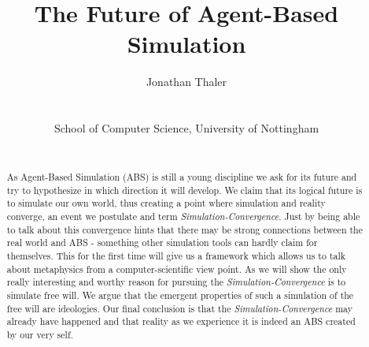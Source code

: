\documentclass[a4paper, 10pt, conference]{../../templates/IEEEconf/IEEEconf}
\title{The Future of Agent-Based Simulation}
\author{
	Jonathan Thaler \\
	\email{jonathan.thaler@nottingham.ac.uk} \\
	\begin{affiliation}
		School of Computer Science, University of Nottingham
	\end{affiliation} \\
}
\begin{document}
\maketitle

\begin{abstract}
As Agent-Based Simulation (ABS) is still a young discipline we ask for its future and try to hypothesize in which direction it will develop. We claim that its logical future is to simulate our own world, thus creating a point where simulation and reality converge, an event we postulate and term \textit{Simulation-Convergence}. Just by being able to talk about this convergence hints that there may be strong connections between the real world and ABS - something other simulation tools can hardly claim for themselves. This for the first time will give us a framework which allows us to talk about metaphysics from a computer-scientific view point. As we will show the only really interesting and worthy reason for pursuing the \textit{Simulation-Convergence} is to simulate free will. We argue that the emergent properties of such a simulation of the free will are ideologies. Our final conclusion is that the \textit{Simulation-Convergence} may already have happened and that reality as we experience it is indeed an ABS created by our very self.
\end{abstract}













\end{document}
